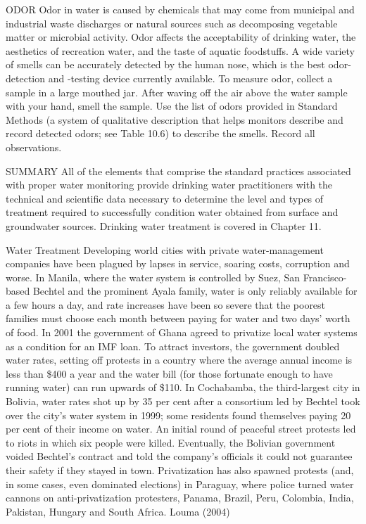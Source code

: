 \documentclass{article}
\begin{document}
ODOR Odor in water is caused by chemicals that may come from municipal
and industrial waste discharges or natural sources such as decomposing
vegetable matter or microbial activity. Odor affects the acceptability
of drinking water, the aesthetics of recreation water, and the taste of
aquatic foodstuffs. A wide variety of smells can be accurately detected
by the human nose, which is the best odor-detection and -testing device
currently available. To measure odor, collect a sample in a large
mouthed jar. After waving off the air above the water sample with your
hand, smell the sample. Use the list of odors provided in Standard
Methods (a system of qualitative description that helps monitors
describe and record detected odors; see Table 10.6) to describe the
smells. Record all observations.

SUMMARY All of the elements that comprise the standard practices
associated with proper water monitoring provide drinking water
practitioners with the technical and scientific data necessary to
determine the level and types of treatment required to successfully
condition water obtained from surface and groundwater sources. Drinking
water treatment is covered in Chapter 11.

Water Treatment Developing world cities with private water-management
companies have been plagued by lapses in service, soaring costs,
corruption and worse. In Manila, where the water system is controlled by
Suez, San Francisco-based Bechtel and the prominent Ayala family, water
is only reliably available for a few hours a day, and rate increases
have been so severe that the poorest families must choose each month
between paying for water and two days' worth of food. In 2001 the
government of Ghana agreed to privatize local water systems as a
condition for an IMF loan. To attract investors, the government doubled
water rates, setting off protests in a country where the average annual
income is less than \$400 a year and the water bill (for those fortunate
enough to have running water) can run upwards of \$110. In Cochabamba,
the third-largest city in Bolivia, water rates shot up by 35 per cent
after a consortium led by Bechtel took over the city's water system in
1999; some residents found themselves paying 20 per cent of their income
on water. An initial round of peaceful street protests led to riots in
which six people were killed. Eventually, the Bolivian government voided
Bechtel's contract and told the company's officials it could not
guarantee their safety if they stayed in town. Privatization has also
spawned protests (and, in some cases, even dominated elections) in
Paraguay, where police turned water cannons on anti-privatization
protesters, Panama, Brazil, Peru, Colombia, India, Pakistan, Hungary and
South Africa. Louma (2004)
\end{document}
